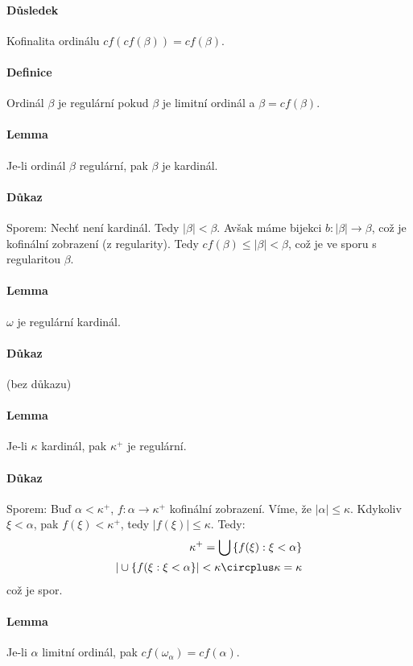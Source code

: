 \documentclass[a4paper,12pt,titlepage]{article}
\begin{document}
\begin{enumerate}
\paragraph{Důsledek}
Kofinalita ordinálu $cf(cf(\beta)) = cf(\beta)$.
\paragraph{Definice}
Ordinál $\beta$ je regulární pokud $\beta$ je limitní ordinál a $\beta =
cf(\beta)$.
\paragraph{Lemma}
Je-li ordinál $\beta$ regulární, pak $\beta$ je kardinál.
\paragraph{Důkaz} Sporem: Nechť \beta není kardinál. Tedy $|\beta| < \beta$.
Avšak máme bijekci $b: |\beta| \to \beta$, což je kofinální zobrazení (z
regularity). Tedy $cf(\beta) \le |\beta| < \beta$, což je ve sporu s regularitou
$\beta$.
\paragraph{Lemma}
$\omega$ je regulární kardinál.
\paragraph{Důkaz}
(bez důkazu)
\paragraph{Lemma}
Je-li $\kappa$ kardinál, pak $\kappa^+$ je regulární.
\paragraph{Důkaz}
Sporem: Buď $\alpha < \kappa^+$, $f: \alpha \to \kappa^+$ kofinální zobrazení.
Víme, že
	$|\alpha| \le \kappa$.
Kdykoliv $\xi < \alpha$, pak $f(\xi) < \kappa^+$, tedy $|f(\xi)| \le \kappa$.
Tedy:
\begin{align}
	\kappa^+ = \bigcup \left\{f(\xi) : \xi < \alpha \right\} \\
	|\cup \{f(\xi: \xi < \alpha \}| < \kappa \circplus\kappa = \kappa
\end{align}
což je spor.
\paragraph{Lemma}
Je-li $\alpha$ limitní ordinál, pak $cf(\omega_\alpha) = cf(\alpha)$.

\end{enumerate}
\end{document}
